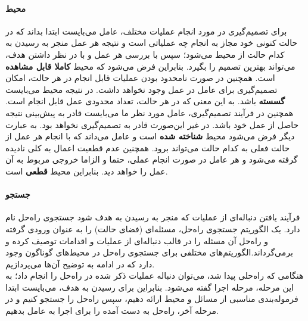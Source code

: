 	\paragraph{محیط}
	برای تصمیم‌گیری در مورد انجام عملیات مختلف، عامل می‌بایست ابتدا بداند که در حالت کنونی خود مجاز به انجام چه عملیاتی است و نتیجه هر عمل منجر به رسیدن به کدام حالت از محیط می‌شود؛ سپس با بررسی هر عمل و با در نظر داشتن هدف، می‌تواند بهترین تصمیم را بگیرد. بنابراین فرض می‌شود که محیط
	\textbf{کاملا قابل مشاهده}
	است. همچنین در صورت نامحدود بودن عملیات قابل انجام در هر حالت، امکان تصمیم‌گیری برای عامل در عمل وجود نخواهد داشت. در نتیجه محیط می‌بایست
	\textbf{گسسته}
	باشد. به این معنی که در هر حالت، تعداد محدودی عمل قابل انجام است. همچنین در فرآیند تصمیم‌گیری، عامل مورد نظر ما می‌بایست قادر به پیش‌بینی نتیجه حاصل از عمل خود باشد. در غیر این‌صورت قادر به تصمیم‌گیری نخواهد بود. به عبارت دیگر فرض می‌شود محیط
	\textbf{شناخته شده}
	است و عامل می‌داند که با انجام هر عمل از حالت فعلی به کدام حالت می‌تواند برود. همچنین عدم قطعیت اعمال به کلی نادیده گرفته می‌شود و هر عامل در صورت انجام عملی، حتما و الزاما خروجی مربوط به آن عمل را خواهد دید. بنابراین محیط
	\textbf{قطعی}
	است.
	\paragraph{جستجو}
	فرآیند یافتن دنباله‌ای از عملیات که منجر به رسیدن به هدف شود جستجوی راه‌حل نام دارد. یک الگوریتم جستجوی راه‌حل، مسئله‌ای (فضای حالت)‌ را به عنوان ورودی گرفته و راه‌حل آن مسئله را در قالب دنباله‌ای از عملیات و اقدامات توصیف کرده و برمی‌گرداند.الگوریتم‌های مختلفی برای جستجوی راه‌حل در محیط‌های گوناگون وجود دارد که در ادامه به توضیح آن‌ها می‌پردازیم.\\
	هنگامی که راه‌حلی پیدا شد، می‌توان دنباله عملیات ذکر شده در راه‌حل را انجام داد؛ به این مرحله، مرحله اجرا گفته می‌شود. بنابراین برای رسیدن به هدف، می‌بایست ابتدا فرموله‌بندی مناسبی از مسائل و محیط ارائه دهیم، سپس راه‌حل را جستجو کنیم و در مرحله آخر، راه‌حل به دست آمده را برای اجرا به عامل بدهیم.\\
